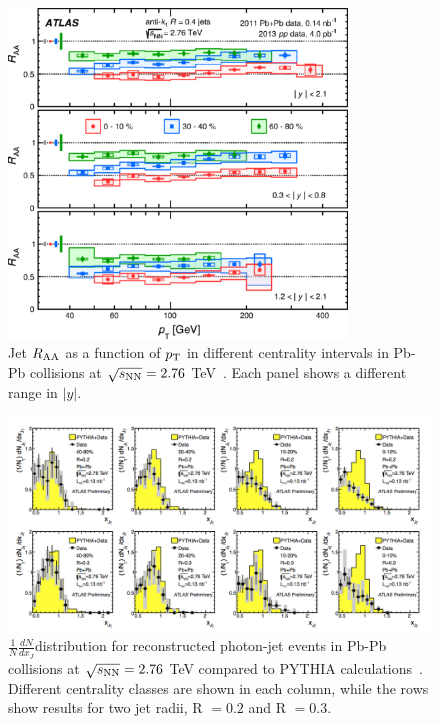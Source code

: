 \begin{figure}[!ht]
  \centering
  \includegraphics[width=9cm]{FigCap1/ATLASjetsRaa.png}
  \caption{Jet $R_{\rm AA}$ as a function of $p_{\rm T}$ in different centrality
intervals in Pb-Pb collisions at $\sqrt{s_{\rm NN}} = 2.76$ TeV~\cite{Aad:2014bxa}. Each panel shows a different range in $|y|$.}
  \label{fig:ATLASjetsRaa}
\end{figure}
\begin{figure}[!ht]
  \centering
  \includegraphics[width=15cm]{FigCap1/ATLASdiijetGammaZ.png}
  \caption{$\frac{1}{N}\frac{dN}{dx_J}$distribution for reconstructed photon-jet events in Pb-Pb collisions at $\sqrt{s_{\rm NN}} = 2.76$ TeV compared to PYTHIA calculations~\cite{ATLAS-CONF-2012-121}. Different centrality classes are shown in each column, while the rows show results for two jet radii, R $= 0.2$ and R $=0.3$.}
  \label{fig:ATLASdijetAsymm}
\end{figure} 
